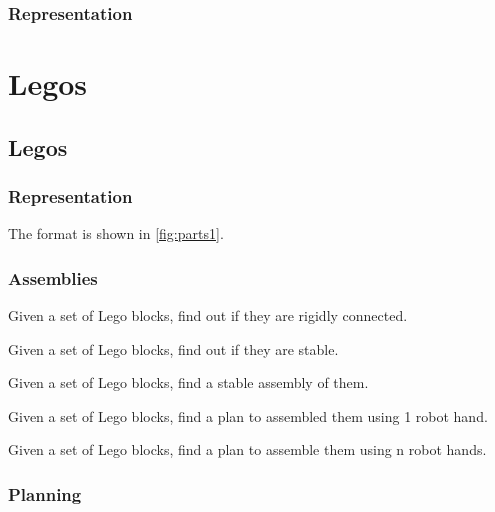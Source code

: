 
\subsection*{Representation}


\chapter{Legos}
\label{ch:exercises-legos}


\section{Legos}

\subsection*{Representation}


The format is shown in \cref{fig:parts1}.


\subsection{Assemblies}

\begin{exercise}
Given a set of Lego blocks, find out if they are rigidly connected.
\end{exercise}

\begin{exercise}
Given a set of Lego blocks, find out if they are stable.
\end{exercise}


\begin{exercise}
Given a set of Lego blocks, find a stable assembly of them.
\end{exercise}

\begin{exercise}
Given a set of Lego blocks, find a plan to assembled them using 1 robot hand.
\end{exercise}

\begin{exercise}
Given a set of Lego blocks, find a plan to assemble them using n robot hands.
\end{exercise}

\subsection{Planning}

